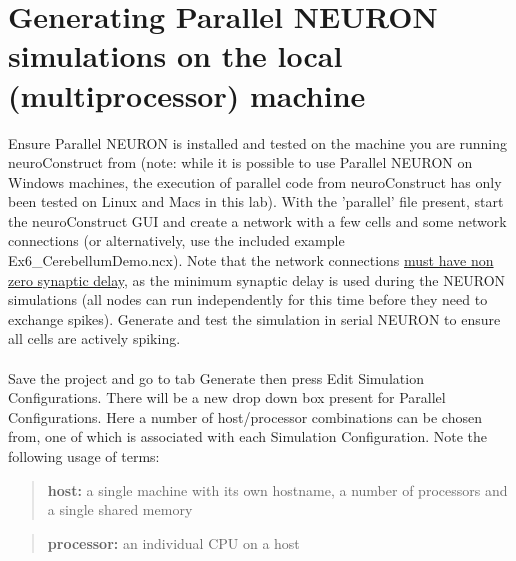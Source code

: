 \documentclass[11pt]{article}
\begin{document}
\section {Generating Parallel NEURON simulations on the local (multiprocessor) machine}
Ensure Parallel NEURON is installed and tested on the machine you are running neuroConstruct from (note: while it is possible to use Parallel NEURON on Windows machines, the execution of parallel code from neuroConstruct has only been tested on Linux and Macs in this lab). With the 'parallel' file present, start the neuroConstruct GUI and create a network with a few cells and some network connections (or alternatively, use the included example Ex6\_CerebellumDemo.ncx). Note that the network connections \underline{must have non zero synaptic delay}, as the minimum synaptic delay is used during the NEURON simulations (all nodes can run independently for this time before they need to exchange spikes). Generate and test the simulation in serial NEURON to ensure all cells are actively spiking. 
\\\\Save the project and go to tab Generate then press Edit Simulation Configurations. There will be a new drop down box present for Parallel Configurations. Here a number of host/processor combinations can be chosen from, one of which is associated with each Simulation Configuration. Note the following usage of terms:
\begin{quotation} 
   \textbf{host:}        a single machine with its own hostname, a number of processors and a single shared memory
\end{quotation}
\begin{quotation} 
   \textbf{processor:}   an individual CPU on a host
\end{quotation}
\end{document}
